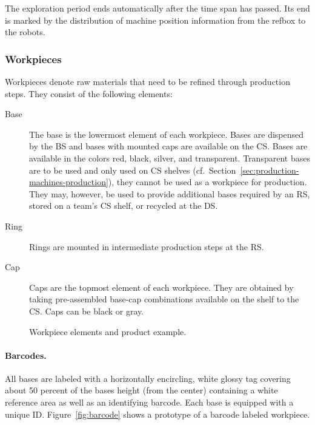 \documentclass[12pt,twoside]{article}
\newcommand{\refsec}[1]{Section~\ref{#1}}
\newcommand{\reffig}[1]{Figure~\ref{#1}}
\begin{document}
The exploration period ends automatically after the time span has passed.
Its end is marked by the distribution of machine position information from the
\ac{refbox} to the robots.



\subsubsection{Workpieces}
\label{sec:workpieces}
Workpieces denote raw materials that need to be refined through production
steps.
They consist of the following elements:
\begin{description}
\item[Base] The base is the lowermost element of each workpiece.
  Bases are dispensed by the \acf{BS} and bases with mounted
  caps are available on the \acf{CS}. Bases are available in
  the colors red, black, silver, and transparent. Transparent bases
  are to be used and only used on \ac{CS} shelves
  (cf.~\refsec{sec:production-machines-production}), they cannot be
  used as a workpiece for production. They may, however, be used to
  provide additional bases required by an \ac{RS}, stored on a team's \ac{CS}
  shelf, or recycled at the \ac{DS}.
\item[Ring] Rings are mounted in intermediate production steps at the \acf{RS}.
\item[Cap] Caps are the topmost element of each workpiece. They are
  obtained by taking pre-assembled base-cap combinations available on
  the shelf to the \acf{CS}. Caps can be black or gray.
\end{description}

\begin{figure}[ht]
  \centering
  \quad
  \quad
  \caption{Workpiece elements and product example.}
  \label{fig:workpieces}
\end{figure}

\paragraph{Barcodes.}
All bases are labeled with a horizontally encircling, white glossy tag
covering about 50 percent of the bases height (from the center)
containing a white reference area as well as an identifying
barcode. Each base is equipped with a unique ID\@. \reffig{fig:barcode}
shows a prototype of a barcode labeled workpiece.
\end{document}
